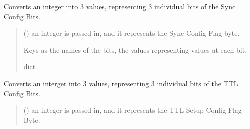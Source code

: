 \documentclass[letterpaper,10pt,english]{sphinxmanual}
\begin{document}
\begin{fulllineitems}

\begin{fulllineitems}
\label{\detokenize{PodApi.Devices:PodApi.Devices.PodDevice_8480SC.Pod8480SC.DecodeSyncConfigBits}}
\pysigstartsignatures
{}
\pysigstopsignatures
\sphinxAtStartPar
Converts an integer into 3 values, representing 3 individual bits of the Sync Config Bits.
\begin{quote}\begin{description}
\sphinxAtStartPar
{} () \textendash{} an integer is passed in, and it represents the Sync Config Flag byte.

\sphinxAtStartPar
Keys as the names of the bits, the values representing values at each bit.

\sphinxAtStartPar
dict

\end{description}\end{quote}

\end{fulllineitems}


\begin{fulllineitems}
\label{\detokenize{PodApi.Devices:PodApi.Devices.PodDevice_8480SC.Pod8480SC.DecodeTTlConfigBits}}
\pysigstartsignatures
{}
\pysigstopsignatures
\sphinxAtStartPar
Converts an interger into 3 values, representing 3 individual bits of the TTL Config Bits.
\begin{quote}\begin{description}
\sphinxAtStartPar
{} () \textendash{} an integer is passed in, and it represents the TTL Setup Config Flag Byte.


\end{description}
\end{quote}
\end{fulllineitems}
\end{fulllineitems}
\end{document}
